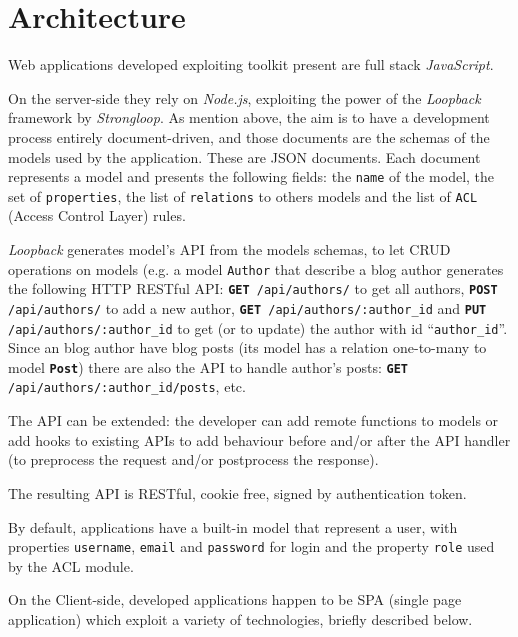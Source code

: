 \section{Architecture}
Web applications developed exploiting  toolkit present are full stack {\em JavaScript}. 

On the server-side they rely on {\em Node.js}, exploiting the power of the {\em Loopback} framework by {\em Strongloop}. As mention above, the aim is to have a development process entirely document-driven, and those documents are the schemas of the models used by the application. These are JSON documents. Each document represents a model and presents the following fields: the \texttt{name} of the model, the set of \texttt{properties}, the list of \texttt{relations} to others models and the list of \texttt{ACL} (Access Control Layer) rules. 

{\em Loopback} generates model’s API from the models schemas, to let CRUD operations on models (e.g. a model \texttt{Author} that describe a blog author generates the following HTTP RESTful API: \texttt{{\bf GET} /api/authors/} to get all authors, \texttt{{\bf POST} /api/authors/} to add a new author, \texttt{{\bf GET} /api/authors/:author\_id} and \texttt{{\bf PUT} /api/authors/:author\_id} to get (or to update) the author with id ``\texttt{author\_id}''. 
Since an blog author have blog posts (its model has a relation one-to-many to model \texttt{{\bf Post}}) there are also the API to handle author's posts: \texttt{{\bf GET} /api/authors/:author\_id/posts}, etc.

The API can be extended: the developer can add remote functions to models or add hooks to existing APIs to add behaviour before and/or after the API handler (to preprocess the request and/or postprocess the response). 

The resulting API is RESTful, cookie free, signed by authentication token.

By default, applications have a built-in model that represent a user, with properties \texttt{username}, \texttt{email} and \texttt{password} for login and the property \texttt{role} used by the ACL module.


On the Client-side, developed applications happen to be SPA (single page application) which exploit a variety of technologies, briefly described below. 

